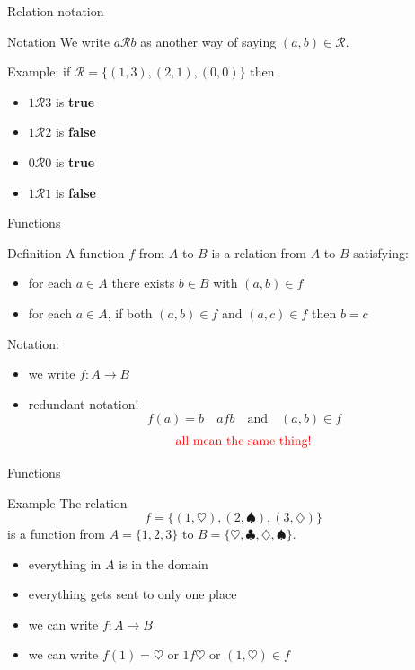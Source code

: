 \documentclass{beamer}
\begin{document}
\begin{frame}{Relation notation}
\begin{block}{Notation}
We write $a\mathcal R b$ as another way of saying $(a,b)\in\mathcal R$.
\end{block}
\pause
Example: if $\mathcal R  = \{(1,3),(2,1),(0,0)\}$ then
\begin{itemize}
\pause
\item $1\mathcal R3$ is \textbf{true}
\pause
\item $1\mathcal R2$ is \textbf{false}
\pause
\item $0\mathcal R0$ is \textbf{true}
\pause
\item $1\mathcal R1$ is \textbf{false}
\end{itemize}
\end{frame}

\begin{frame}{Functions}
\pause
\begin{block}{Definition}
\pause
A function $f$ from $A$ to $B$ is a relation from $A$ to $B$ satisfying:
\begin{itemize}
\pause
\item for each $a\in A$ there exists $b\in B$ with $(a,b)\in f$
\pause
\item for each $a\in A$, if both $(a,b)\in f$ and $(a,c)\in f$ then $b=c$
\end{itemize}
\end{block}
\pause
Notation:
\begin{itemize}
\pause
\item we write $f: A\rightarrow B$
\pause
\item redundant notation!
\pause
$$f(a) = b\quad afb\quad\text{and}\quad (a,b)\in f$$
$$\text{\color{red}all mean the same thing!}$$
\end{itemize}
\end{frame}

\begin{frame}{Functions}
\begin{block}{Example}
The relation
$$f = \{(1,\heartsuit),(2,\spadesuit),(3,\diamondsuit)\}$$
is a function from $A = \{1,2,3\}$ to $B = \{\heartsuit,\clubsuit,\diamondsuit,\spadesuit\}$.
\end{block}
\begin{itemize}
\pause
\item everything in $A$ is in the domain
\pause
\item everything gets sent to only one place
\pause
\item we can write $f: A\rightarrow B$
\pause
\item we can write $f(1)=\heartsuit$ or $1f\heartsuit$ or $(1,\heartsuit)\in f$
\end{itemize}
\end{frame}
\end{document}
